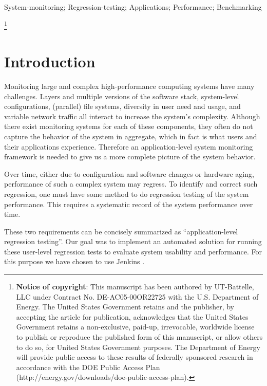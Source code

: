 \documentclass[10pt, conference, compsocconf]{IEEEtran}
\newcommand\blfootnote[1]{%
  \begingroup
  \renewcommand\thefootnote{}\footnote{#1}%
  \addtocounter{footnote}{-1}%
  \endgroup
}
\begin{document}
\begin{IEEEkeywords}
System-monitoring; Regression-testing; Applications; Performance; Benchmarking
\end{IEEEkeywords}

\blfootnote{\textbf{Notice of copyright}: This manuscript has been authored by UT-Battelle, LLC under Contract No. DE-AC05-00OR22725 with the U.S. Department of Energy. The United States Government retains and the publisher, by accepting the article for publication, acknowledges that the United States Government retains a non-exclusive, paid-up, irrevocable, worldwide license to publish or reproduce the published form of this manuscript, or allow others to do so, for United States Government purposes. The Department of Energy will provide public access to these results of federally sponsored research in accordance with the DOE Public Access Plan (http://energy.gov/downloads/doe-public-access-plan).}

\section{Introduction}
\label{sec:introduction}

Monitoring large and complex high-performance computing systems have many challenges. 
Layers and multiple versions of the software stack, system-level configurations, (parallel) file systems, diversity in user need and usage, and variable network traffic all interact to increase the system's complexity. 
Although there exist monitoring systems for each of these components, they often do not capture the behavior of the system in aggregate, which in fact is what users and their applications experience. 
Therefore an application-level system monitoring framework is needed to give us a more complete picture of the system behavior. 
 

Over time, either due to configuration and software changes or hardware aging, performance of such a complex system may regress. 
To identify and correct such regression, one must have some method to do regression testing of the system performance. 
This requires a systematic record of the system performance over time.

These two requirements can be concisely summarized as ``application-level regression testing''. 
Our goal was to implement an automated solution for running these user-level regression tests to evaluate system usability and performance. 
For this purpose we have chosen to use Jenkins \cite{jenkins}.
\end{document}
